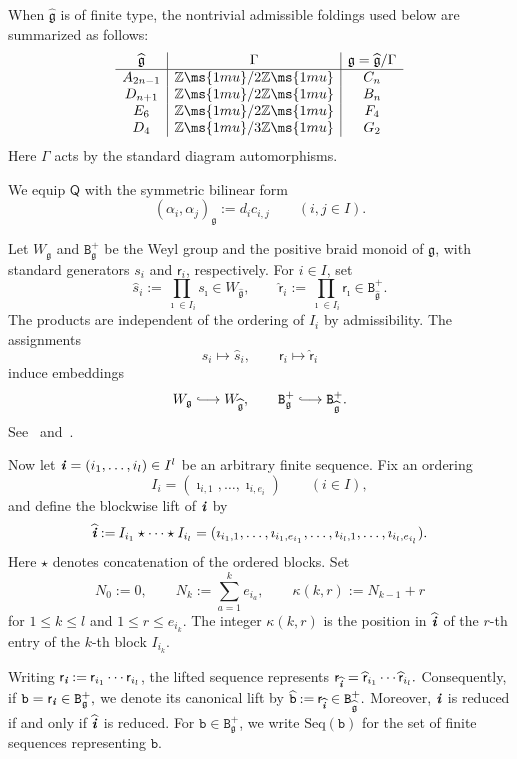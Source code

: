 \documentclass[12pt, leqno]{amsart}
\numberwithin{equation}{section}
\theoremstyle{plain}
\theoremstyle{definition}
\newcommand{\seteq}{\mathbin{:=}}
\newcommand{\g}{\mathfrak{g}}
\newcommand{\Z}{\mathbb{Z}\ms{1mu}}
\newcommand{\im}{\imath}
\newcommand{\ii}{ \textbf{\textit{i}}}
\newcommand{\hg}{{\widehat{\g}}}
\newcommand{\hs}{\widehat{s}}
\newcommand{\hii}{{\widehat{\ii}}}
\newcommand{\sfQ}{\mathsf{Q}}
\newcommand{\sfr}{\mathsf{r}}
\newcommand{\hsfr}{\widehat{\sfr}}
\newcommand{\ttB}{\mathtt{B}}
\newcommand{\ttb}{\mathtt{b}}
\newcommand{\httb}{\widehat{\ttb}}
\newcommand{\Seq}{\mathrm{Seq}}
\begin{document}
When \(\hg\) is of finite type, the nontrivial admissible foldings
used below are summarized as follows:
\begin{align} \label{eq: finite folding}
\begin{array}{c|c|c}
\hg & \Gamma & \g=\hg/\Gamma\\
\hline
A_{2n-1} & \Z/2\Z & C_n\\
D_{n+1}  & \Z/2\Z & B_n\\
E_6      & \Z/2\Z & F_4\\
D_4      & \Z/3\Z & G_2
\end{array}    
\end{align}
Here \(\Gamma\) acts by the standard diagram automorphisms.

We equip \(\sfQ\) with the symmetric bilinear form
\[
(\alpha_i,\alpha_j)_\g
\seteq
d_i c_{i,j}
\qquad(i,j\in I).
\]
 

Let \(W_\g\) and \(\ttB_\g^+\) be the Weyl group and the positive
braid monoid of \(\g\), with standard generators \(s_i\) and
\(\sfr_i\), respectively.
For \(i\in I\), set
\[
\hs_i \seteq \prod_{\im\in I_i}s_\im \in W_\hg,
\qquad
\hsfr_i \seteq \prod_{\im\in I_i}\sfr_\im \in \ttB^+_\hg.
\]
The products are independent of the ordering of \(I_i\) by
admissibility.  The assignments
\[
s_i\longmapsto\hs_i,
\qquad
\sfr_i\longmapsto\hsfr_i
\]
induce embeddings
\[
W_\g\lhook\joinrel\longrightarrow W_\hg,
\qquad
\ttB_\g^+\lhook\joinrel\longrightarrow\ttB_\hg^+.
\]
See~\cite[Theorem~28]{Castella08} and~\cite[Corollary~2.5]{JO26}.

Now let $\ii=(i_1,\ldots,i_l)\in I^l$ be an arbitrary finite sequence.  %
Fix an ordering
\[
I_i=(\im_{i,1},\ldots,\im_{i,e_i})
\qquad(i\in I),
\]
and define the blockwise lift of \(\ii\) by
\begin{align}\label{eq: seq lift}
\hii \seteq I_{i_1}\star\cdots\star I_{i_l} = (\im_{i_1,1},\ldots,\im_{i_1,e_{i_1}},  \ldots,  \im_{i_l,1},\ldots,\im_{i_l,e_{i_l}}).    
\end{align}
Here \(\star\) denotes concatenation of the ordered blocks.
Set
\[
N_0\seteq0,
\qquad
N_k\seteq\sum_{a=1}^ke_{i_a},
\qquad
\kappa(k,r)\seteq N_{k-1}+r
\]
for \(1\leq k\leq l\) and \(1\leq r\leq e_{i_k}\).   The integer \(\kappa(k,r)\) is the position in \(\hii\) of the
\(r\)-th entry of the \(k\)-th block \(I_{i_k}\).

Writing
$\sfr_\ii \seteq \sfr_{i_1}\cdots\sfr_{i_l}$, the lifted sequence represents
$\sfr_\hii = \hsfr_{i_1}\cdots \hsfr_{i_l}.$ 
Consequently, if $\ttb=\sfr_\ii\in\ttB_\g^+,$ we denote its canonical lift by $\httb \seteq \sfr_\hii\in\ttB_\hg^+.$
Moreover, \(\ii\) is reduced if and only if \(\hii\) is reduced.
For \(\ttb\in\ttB_\g^+\), we write \(\Seq(\ttb)\) for the set of
finite sequences representing \(\ttb\).
\end{document}
